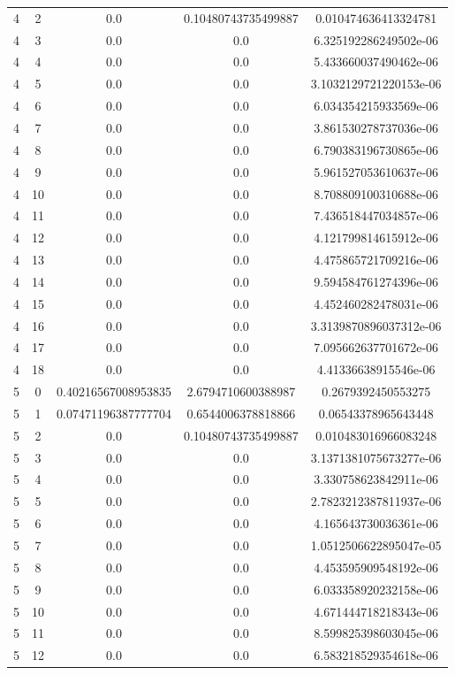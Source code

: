 \documentclass{article}
\begin{document}
\begin{table}[h]
\begin{tabular}{|c|c|c|c|c|}
4 & 2 & 0.0 & 0.10480743735499887 & 0.010474636413324781 \\
4 & 3 & 0.0 & 0.0 & 6.325192286249502e-06 \\
4 & 4 & 0.0 & 0.0 & 5.433660037490462e-06 \\
4 & 5 & 0.0 & 0.0 & 3.1032129721220153e-06 \\
4 & 6 & 0.0 & 0.0 & 6.034354215933569e-06 \\
4 & 7 & 0.0 & 0.0 & 3.861530278737036e-06 \\
4 & 8 & 0.0 & 0.0 & 6.790383196730865e-06 \\
4 & 9 & 0.0 & 0.0 & 5.961527053610637e-06 \\
4 & 10 & 0.0 & 0.0 & 8.708809100310688e-06 \\
4 & 11 & 0.0 & 0.0 & 7.436518447034857e-06 \\
4 & 12 & 0.0 & 0.0 & 4.121799814615912e-06 \\
4 & 13 & 0.0 & 0.0 & 4.475865721709216e-06 \\
4 & 14 & 0.0 & 0.0 & 9.594584761274396e-06 \\
4 & 15 & 0.0 & 0.0 & 4.452460282478031e-06 \\
4 & 16 & 0.0 & 0.0 & 3.3139870896037312e-06 \\
4 & 17 & 0.0 & 0.0 & 7.095662637701672e-06 \\
4 & 18 & 0.0 & 0.0 & 4.41336638915546e-06 \\
5 & 0 & 0.40216567008953835 & 2.6794710600388987 & 0.2679392450553275 \\
5 & 1 & 0.07471196387777704 & 0.6544006378818866 & 0.06543378965643448 \\
5 & 2 & 0.0 & 0.10480743735499887 & 0.010483016966083248 \\
5 & 3 & 0.0 & 0.0 & 3.1371381075673277e-06 \\
5 & 4 & 0.0 & 0.0 & 3.330758623842911e-06 \\
5 & 5 & 0.0 & 0.0 & 2.7823212387811937e-06 \\
5 & 6 & 0.0 & 0.0 & 4.165643730036361e-06 \\
5 & 7 & 0.0 & 0.0 & 1.0512506622895047e-05 \\
5 & 8 & 0.0 & 0.0 & 4.453595909548192e-06 \\
5 & 9 & 0.0 & 0.0 & 6.033358920232158e-06 \\
5 & 10 & 0.0 & 0.0 & 4.671444718218343e-06 \\
5 & 11 & 0.0 & 0.0 & 8.599825398603045e-06 \\
5 & 12 & 0.0 & 0.0 & 6.583218529354618e-06 \\

\end{tabular}
\end{table}
\end{document}
